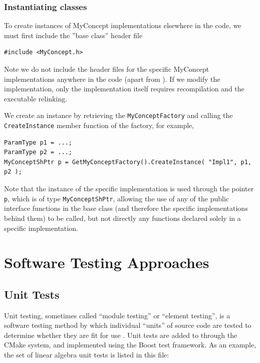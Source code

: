 \subsubsection{Instantiating classes}
To create instances of MyConcept implementations elsewhere in the code, we must
first include the ''base class'' header file
\begin{lstlisting}
#include <MyConcept.h>
\end{lstlisting}
Note we do not include the header files for the specific MyConcept 
implementations anywhere in the code (apart from ).
If we modify the implementation, only the implementation itself requires 
recompilation and the executable relinking.

We create an instance by retrieving the \lstinline{MyConceptFactory} and calling the \lstinline{CreateInstance} member function of the factory, for example,
\begin{lstlisting}
ParamType p1 = ...;
ParamType p2 = ...;
MyConceptShPtr p = GetMyConceptFactory().CreateInstance( "Impl1", p1, p2 );
\end{lstlisting}

Note that the instance of the specific implementation is used through the pointer \lstinline{p}, which is of type \lstinline{MyConceptShPtr}, allowing the use of any of the public interface functions in the base class (and therefore the specific implementations behind them) to be
called, but not directly any functions declared solely in a specific
implementation.



\section{Software Testing Approaches}

\subsection{Unit Tests}

Unit testing, sometimes called ``module testing'' or ``element testing'', is a
software testing method by which individual ``units'' of source code
are tested to determine whether they are fit for use
\cite{KFN-testing}.  Unit tests are added to {\nek} through the
CMake system, and implemented using the Boost test framework.
As an example, the set of linear algebra unit tests is
listed in this file:

